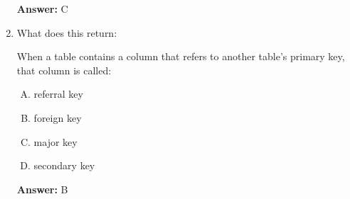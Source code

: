 \documentclass[12pt]{article}
\begin{document}
\begin{enumerate}[1.]
    \bigskip

    \textbf{Answer:} C

    \item

    What does this return:

    \bigskip

    When a table contains a column that refers to another table's primary key,
    that column is called:

    \bigskip

    \begin{enumerate}[A.]
        \item referral key
        \item foreign key
        \item major key
        \item secondary key
    \end{enumerate}

    \bigskip

    \textbf{Answer:} B
\end{enumerate}
\end{document}
